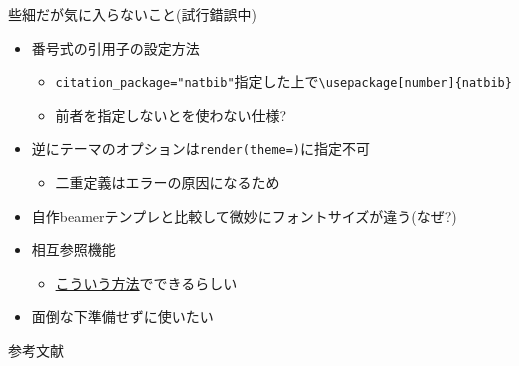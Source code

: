 \documentclass[14pt,ignorenonframetext,]{beamer}
\newif\ifbibliography
\providecommand{\tightlist}{%
  \setlength{\itemsep}{0pt}\setlength{\parskip}{0pt}}
\begin{document}
\begin{frame}[fragile]{些細だが気に入らないこと(試行錯誤中)}
\protect\hypertarget{ux4e9bux7d30ux3060ux304cux6c17ux306bux5165ux3089ux306aux3044ux3053ux3068ux8a66ux884cux932fux8aa4ux4e2d}{}

\begin{itemize}
\tightlist
\item
  番号式の引用子の設定方法

  \begin{itemize}
  \tightlist
  \item
    \texttt{citation\_package="natbib"}指定した上で\texttt{\textbackslash{}usepackage{[}number{]}\{natbib\}}
  \item
    前者を指定しないと\BibTeX を使わない仕様?
  \end{itemize}
\item
  逆にテーマのオプションは\texttt{render(theme=)}に指定不可

  \begin{itemize}
  \tightlist
  \item
    二重定義はエラーの原因になるため
  \end{itemize}
\item
  自作beamerテンプレと比較して微妙にフォントサイズが違う(なぜ?)
\item
  相互参照機能

  \begin{itemize}
  \tightlist
  \item
    \href{https://stackoverflow.com/questions/54041552/impossible-to-cross-referring-figures-and-tables-with-beamer-presentation-opti}{こういう方法}でできるらしい
  \end{itemize}
\item
  面倒な下準備せずに\upBibTeX 使いたい
\end{itemize}

\end{frame}

\renewcommand\refname{参考文献}
\begin{frame}[allowframebreaks]{参考文献}
\bibliographytrue

\end{frame}
\end{document}
